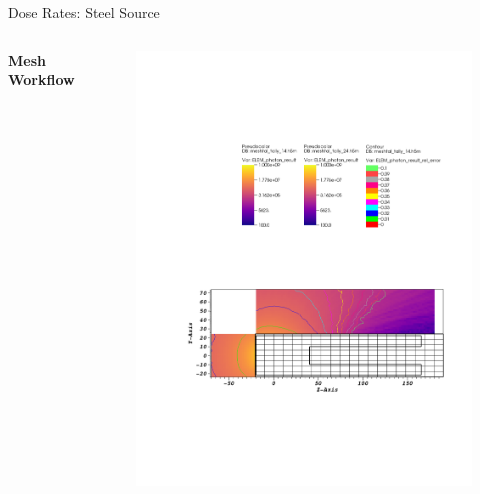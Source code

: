 \documentclass{beamer}
\begin{document}
\begin{frame}{Dose Rates: Steel Source}
\begin{columns}[T]
        \textbf{Mesh Workflow}
        \begin{figure}
                \centering
                \includegraphics[scale=0.49,trim={2.5cm 6cm 1cm 15cm},clip]{figs/dose_steel_mesh_novoid.pdf}
        \end{figure}


\end{columns}
\end{frame}
\end{document}
